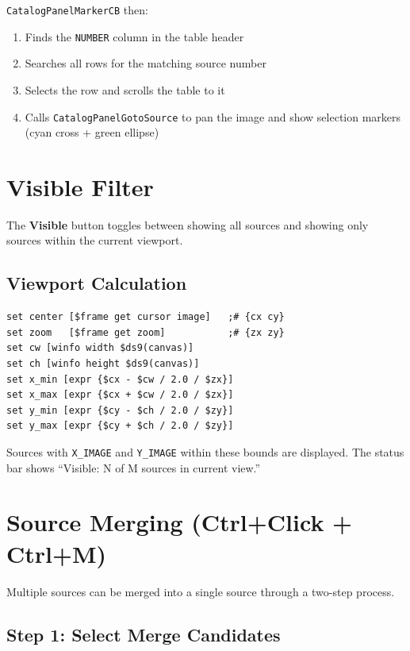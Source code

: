 \documentclass[11pt,fleqn]{book}
\begin{document}
\texttt{CatalogPanelMarkerCB} then:
\begin{enumerate}[leftmargin=2em]
  \item Finds the \texttt{NUMBER} column in the table header
  \item Searches all rows for the matching source number
  \item Selects the row and scrolls the table to it
  \item Calls \texttt{CatalogPanelGotoSource} to pan the image and show selection markers (cyan cross + green ellipse)
\end{enumerate}


\section{Visible Filter}

The \textbf{Visible} button toggles between showing all sources and showing only sources within the current viewport.

\subsection{Viewport Calculation}

\begin{codebox}
\begin{lstlisting}[style=tcl,numbers=none]
set center [$frame get cursor image]   ;# {cx cy}
set zoom   [$frame get zoom]           ;# {zx zy}
set cw [winfo width $ds9(canvas)]
set ch [winfo height $ds9(canvas)]
set x_min [expr {$cx - $cw / 2.0 / $zx}]
set x_max [expr {$cx + $cw / 2.0 / $zx}]
set y_min [expr {$cy - $ch / 2.0 / $zy}]
set y_max [expr {$cy + $ch / 2.0 / $zy}]
\end{lstlisting}
\end{codebox}

Sources with \texttt{X\_IMAGE} and \texttt{Y\_IMAGE} within these bounds are displayed. The status bar shows ``Visible: N of M sources in current view.''


\section{Source Merging (Ctrl+Click + Ctrl+M)}

Multiple sources can be merged into a single source through a two-step process.

\subsection{Step 1: Select Merge Candidates}
\end{document}
